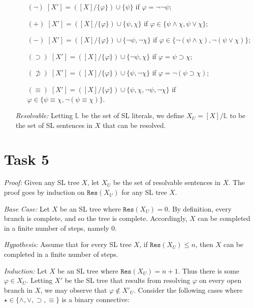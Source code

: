 \documentclass[a4paper, 11pt]{article} %
\newcommand{\set}[1]{\lbrace#1\rbrace} %
\newcommand{\res}{\texttt{Res}}
\begin{document}
\begin{itemize}
        \begin{itemize}
          \item[$(\neg)$] $[X']=([X]/\set{\varphi})\cup\set{\psi}$ if $\varphi=\neg\neg\psi$;
          \item[$(+)$] $[X']=([X]/\set{\varphi})\cup\set{\psi,\chi}$ if $\varphi\in\set{\psi\wedge\chi,\psi\vee\chi}$;  
          \item[$(-)$] $[X']=([X]/\set{\varphi})\cup\set{\neg\psi,\neg\chi}$ if $\varphi\in\set{\neg(\psi\wedge\chi),\neg(\psi\vee\chi)}$;
          \item[$(\supset)$] $[X']=([X]/\set{\varphi})\cup\set{\neg\psi,\chi}$ if $\varphi=\psi\supset\chi$; 
          \item[$(\not\supset)$] $[X']=([X]/\set{\varphi})\cup\set{\psi,\neg\chi}$ if $\varphi=\neg(\psi\supset\chi)$; 
          \item[$(\equiv)$] $[X']=([X]/\set{\varphi})\cup\set{\psi,\chi, \neg\psi,\neg\chi}$ if $\varphi\in\set{\psi\equiv\chi,\neg(\psi\equiv\chi)}$.
        \end{itemize}
  \item[\it Resolvable:] Letting $\mathbb{L}$ be the set of SL literals, we define $X_U=[X]/\mathbb{L}$ to be the set of SL sentences in $X$ that can be resolved. 
\end{itemize}


\section*{Task 5}

\textit{Proof:}
Given any SL tree $X$, let $X_U$ be the set of resolvable sentences in $X$.
The proof goes by induction on $\res(X_U)$ for any SL tree $X$. 

\textit{Base Case:}
Let $X$ be an SL tree where $\res(X_U)=0$.
By definition, every branch is complete, and so the tree is complete.
Accordingly, $X$ can be completed in a finite number of steps, namely $0$. 

\textit{Hypothesis:}
Assume that for every SL tree $X$, if $\res(X_U)\leq n$, then $X$ can be completed in a finite number of steps. 

\textit{Induction:}
Let $X$ be an SL tree where $\res(X_U)=n+1$.
Thus there is some $\varphi \in X_U$.
Letting $X'$ be the SL tree that results from resolving $\varphi$ on every open branch in $X$, we may observe that $\varphi \notin X'_U$.
Consider the following cases where $\star\in\set{\wedge,\vee,\supset,\equiv}$ is a binary connective:
\end{document}
